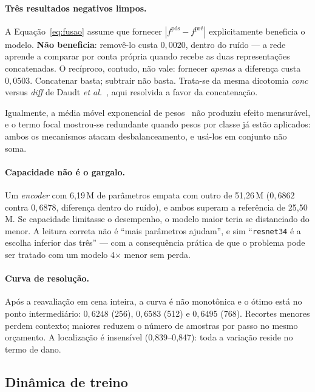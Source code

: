 \documentclass[11pt,a4paper]{article}
\begin{document}
\paragraph{Três resultados negativos limpos.}
A Equação~\ref{eq:fusao} assume que fornecer $|f^{\text{pós}}-f^{\text{pré}}|$
explicitamente beneficia o modelo. \textbf{Não beneficia}: removê-lo custa
$0{,}0020$, dentro do ruído --- a rede aprende a comparar por conta própria
quando recebe as duas representações concatenadas. O recíproco, contudo, não vale:
fornecer \emph{apenas} a diferença custa $0{,}0503$. Concatenar basta; subtrair
não basta. Trata-se da mesma dicotomia \emph{conc} versus \emph{diff} de Daudt
\emph{et al.}~\cite{daudt2018}, aqui resolvida a favor da concatenação.

Igualmente, a média móvel exponencial de pesos~\cite{tarvainen2017} não produziu
efeito mensurável, e o termo focal mostrou-se redundante quando pesos por classe
já estão aplicados: ambos os mecanismos atacam desbalanceamento, e usá-los em
conjunto não soma.

\paragraph{Capacidade não é o gargalo.}
Um \emph{encoder} com 6{,}19\,M de parâmetros empata com outro de 51{,}26\,M
($0{,}6862$ contra $0{,}6878$, diferença dentro do ruído), e ambos superam a
referência de 25{,}50\,M. Se capacidade limitasse o desempenho, o modelo maior
teria se distanciado do menor. A leitura correta não é ``mais parâmetros
ajudam'', e sim ``\texttt{resnet34} é a escolha inferior das três'' --- com a
consequência prática de que o problema pode ser tratado com um modelo 4$\times$
menor sem perda.

\paragraph{Curva de resolução.} Após a reavaliação em cena inteira, a curva é não
monotônica e o ótimo está no ponto intermediário: $0{,}6248$ (256), $0{,}6583$
(512) e $0{,}6495$ (768). Recortes menores perdem contexto; maiores reduzem o
número de amostras por passo no mesmo orçamento. A localização é insensível
(0{,}839--0{,}847): toda a variação reside no termo de dano.

\subsection{Dinâmica de treino}
\end{document}
